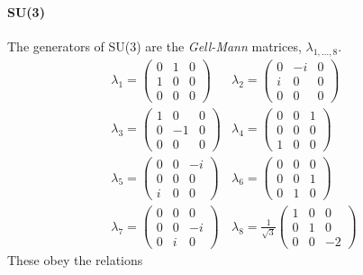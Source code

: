 \paragraph{SU(3)}
The generators of SU(3) are
the \emph{Gell-Mann} matrices, $\lambda_{1,\dots,8}$.
\begin{equation*}
  \begin{matrix}
    \lambda_1 = \begin{pmatrix} 0 & 1 & 0 \\ 1 & 0 & 0 \\ 0 & 0 & 0  \end{pmatrix} &
    \lambda_2 = \begin{pmatrix} 0 & -i &0 \\ i & 0 & 0 \\ 0 & 0 & 0  \end{pmatrix} \\
    \lambda_3 = \begin{pmatrix} 1 & 0 & 0 \\ 0 & -1 & 0 \\ 0 & 0 & 0 \end{pmatrix} &
    \lambda_4 = \begin{pmatrix} 0 & 0 & 1 \\ 0 & 0 & 0 \\ 1 & 0 & 0  \end{pmatrix} \\
    \lambda_5 = \begin{pmatrix} 0 & 0 &-i \\ 0 & 0 & 0 \\ i & 0 & 0  \end{pmatrix} &
    \lambda_6 = \begin{pmatrix} 0 & 0 & 0 \\ 0 & 0 & 1 \\ 0 & 1 & 0  \end{pmatrix} \\
    \lambda_7 = \begin{pmatrix} 0 & 0 & 0 \\0 & 0 & -i \\ 0 & i & 0  \end{pmatrix} &
    \lambda_8 = \frac{1}{\sqrt{3}} \begin{pmatrix} 1 & 0 & 0 \\ 0 & 1 & 0 \\ 0 & 0 & -2 \end{pmatrix}
  \end{matrix}
\end{equation*}
These obey the relations
